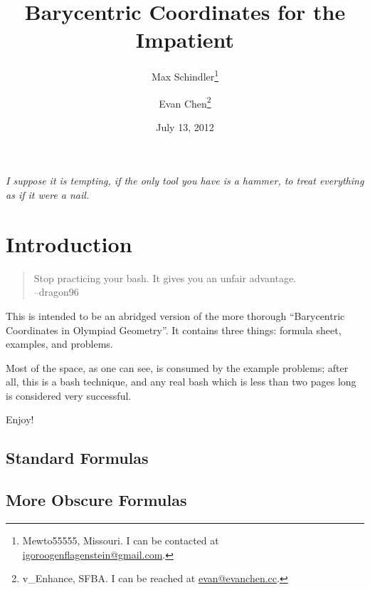 \documentclass{article}
\let\achapter\section
\let\asection\subsection
\let\asubsection\subsubsection
\newcommand{\chapter}[1]{\achapter{#1}}
\renewcommand{\section}[1]{\asection{#1}}
\renewcommand{\subsection}[1]{\asubsection{#1}}
\begin{document}
\title{Barycentric Coordinates for the Impatient}
\author{
  Max Schindler\thanks{Mewto55555, Missouri.
  I can be contacted at \href{mailto:igoroogenflagenstein@gmail.com}{igoroogenflagenstein@gmail.com}.}
  \and
  Evan Chen\thanks{v\_Enhance, SFBA.
  I can be reached at \href{mailto:evan@evanchen.cc}{evan@evanchen.cc}.}
  }

\date{July 13, 2012}

\maketitle
\begin{center}
\begin{minipage}{8.4cm}
  \textit{I suppose it is tempting, if the only tool you have is a hammer, to treat everything as if it were a nail.}
\end{minipage}
\end{center}


\chapter{Introduction}
\begin{quote}
  Stop practicing your bash.  It gives you an unfair advantage. \\ --dragon96
\end{quote}
This is intended to be an abridged version of the more thorough ``Barycentric Coordinates in Olympiad Geometry''.  It contains three things: formula sheet, examples, and problems.

Most of the space, as one can see, is consumed by the example problems; after all, this is a bash technique, and any real bash which is less than two pages long is considered very successful.

Enjoy!


\section{Standard Formulas}


\section{More Obscure Formulas}






\eject
\renewcommand{\section}[2]{\chapter{#2}}

\end{document}
